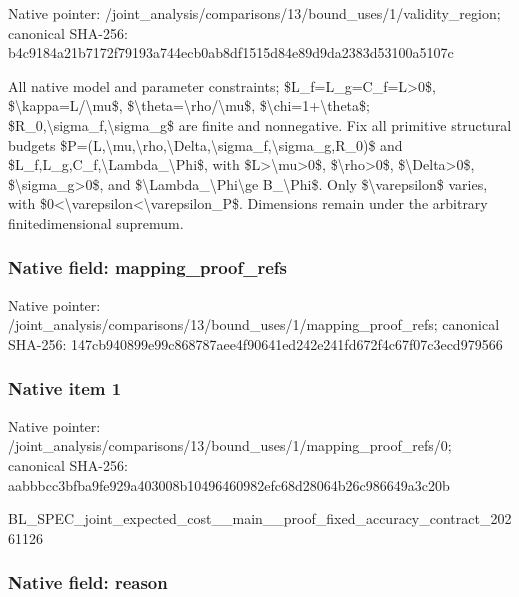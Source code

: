 \documentclass[10pt,a4paper]{article}
\begin{document}
Native pointer: /joint\_analysis/comparis\allowbreak{}ons/13/bound\_uses/1/vali\allowbreak{}dity\_region; canonical SHA-256: b4c9184a21b7172f79193a74\allowbreak{}4ecb0ab8df1515d84e89d9da\allowbreak{}2383d53100a5107c


All native model and parameter constraints; \$L\_f=L\_g=C\_f=L>0\$, \$\textbackslash{}kappa=L/\textbackslash{}mu\$, \$\textbackslash{}theta=\textbackslash{}rho/\textbackslash{}mu\$, \$\textbackslash{}chi=1+\textbackslash{}theta\$; \$R\_0,\textbackslash{}sigma\_f,\textbackslash{}sigma\_g\$ are finite and nonnegative. Fix all primitive structural budgets \$P=(L,\textbackslash{}mu,\textbackslash{}rho,\textbackslash{}Delta,\textbackslash{}s\allowbreak{}igma\_f,\textbackslash{}sigma\_g,R\_0)\$ and \$L\_f,L\_g,C\_f,\textbackslash{}Lambda\_\textbackslash{}Phi\$, with \$L>\textbackslash{}mu>0\$, \$\textbackslash{}rho>0\$, \$\textbackslash{}Delta>0\$, \$\textbackslash{}sigma\_g>0\$, and \$\textbackslash{}Lambda\_\textbackslash{}Phi\textbackslash{}ge B\_\textbackslash{}Phi\$. Only \$\textbackslash{}varepsilon\$ varies, with \$0<\textbackslash{}varepsilon<\textbackslash{}varepsilon\_P\$. Dimensions remain under the arbitrary finitedimensional supremum.


\subsubsection{Native field: mapping\_proof\_refs}


Native pointer: /joint\_analysis/comparis\allowbreak{}ons/13/bound\_uses/1/mapp\allowbreak{}ing\_proof\_refs; canonical SHA-256: 147cb940899e99c868787aee\allowbreak{}4f90641ed242e241fd672f4c\allowbreak{}67f07c3ecd979566



\subsubsection{Native item 1}


Native pointer: /joint\_analysis/comparis\allowbreak{}ons/13/bound\_uses/1/mapp\allowbreak{}ing\_proof\_refs/0; canonical SHA-256: aabbbcc3bfba9fe929a40300\allowbreak{}8b10496460982efc68d28064\allowbreak{}b26c986649a3c20b


BL\_SPEC\_joint\_expected\_c\allowbreak{}ost\_\_main\_\_proof\_fixed\_a\allowbreak{}ccuracy\_contract\_2026112\allowbreak{}6


\subsubsection{Native field: reason}
\end{document}
